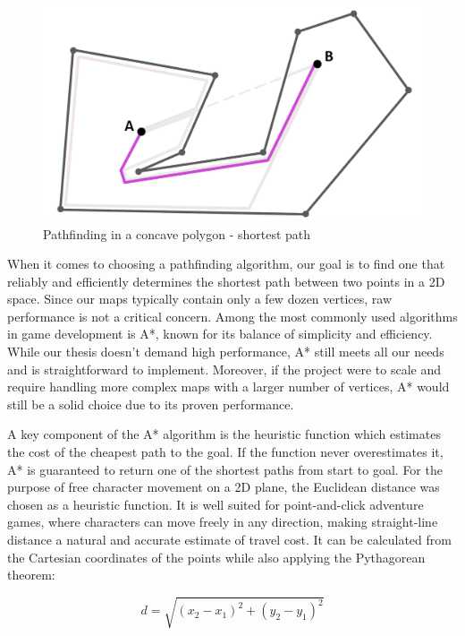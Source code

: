 \begin{figure}[H]
\centering
\includegraphics[width=.7\linewidth]{img/polygon-prototyp2.png}
\caption{Pathfinding in a concave polygon - shortest path}
\label{fig:Path-P2}
\end{figure}

When it comes to choosing a pathfinding algorithm, our goal is to find one that reliably and efficiently determines the shortest path between two points in a 2D space. Since our maps typically contain only a few dozen vertices, raw performance is not a critical concern. Among the most commonly used algorithms in game development is A*, known for its balance of simplicity and efficiency. While our thesis doesn’t demand high performance, A* still meets all our needs and is straightforward to implement. Moreover, if the project were to scale and require handling more complex maps with a larger number of vertices, A* would still be a solid choice due to its proven performance. 

A key component of the A* algorithm is the heuristic function which estimates the cost of the cheapest path to the goal. If the function never overestimates it, A* is guaranteed to return one of the shortest paths from start to goal. For the purpose of free character movement on a 2D plane, the Euclidean distance was chosen as a heuristic function. It is well suited for point-and-click adventure games, where characters can move freely in any direction, making straight-line distance a natural and accurate estimate of travel cost.  It can be calculated from the Cartesian coordinates of the points while also applying the Pythagorean theorem:

\[
d = \sqrt{(x_2 - x_1)^2 + (y_2 - y_1)^2}
\]


